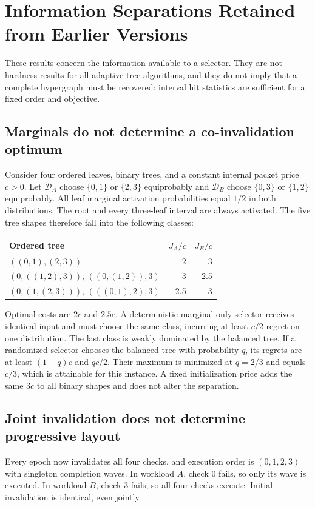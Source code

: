 \section{Information Separations Retained from Earlier Versions}\label{app:separations}
These results concern the information available to a selector. They are not hardness results for all adaptive tree algorithms, and they do not imply that a complete hypergraph must be recovered: interval hit statistics are sufficient for a fixed order and objective.

\subsection{Marginals do not determine a co-invalidation optimum}
Consider four ordered leaves, binary trees, and a constant internal packet price $c>0$. Let $\mathcal D_A$ choose $\{0,1\}$ or $\{2,3\}$ equiprobably and $\mathcal D_B$ choose $\{0,3\}$ or $\{1,2\}$ equiprobably. All leaf marginal activation probabilities equal $1/2$ in both distributions. The root and every three-leaf interval are always activated. The five tree shapes therefore fall into the following classes:
\begin{center}\small
\begin{tabular}{@{}lrr@{}}\toprule
Ordered tree & $J_A/c$ & $J_B/c$\\\midrule
$((0,1),(2,3))$ & 2 & 3\\
$(0,((1,2),3))$, $((0,(1,2)),3)$ & 3 & 2.5\\
$(0,(1,(2,3)))$, $(((0,1),2),3)$ & 2.5 & 3\\\bottomrule
\end{tabular}
\end{center}
Optimal costs are $2c$ and $2.5c$. A deterministic marginal-only selector receives identical input and must choose the same class, incurring at least $c/2$ regret on one distribution. The last class is weakly dominated by the balanced tree. If a randomized selector chooses the balanced tree with probability $q$, its regrets are at least $(1-q)c$ and $qc/2$. Their maximum is minimized at $q=2/3$ and equals $c/3$, which is attainable for this instance. A fixed initialization price adds the same $3c$ to all binary shapes and does not alter the separation.

\subsection{Joint invalidation does not determine progressive layout}
Every epoch now invalidates all four checks, and execution order is $(0,1,2,3)$ with singleton completion waves. In workload $A$, check 0 fails, so only its wave is executed. In workload $B$, check 3 fails, so all four checks execute. Initial invalidation is identical, even jointly.

